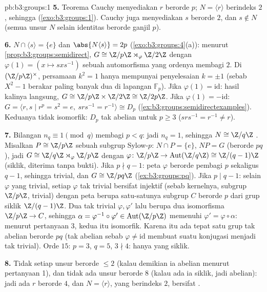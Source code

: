\begin{solution}{pb:b3:groups:1}
\textbf{5.} Teorema Cauchy menyediakan $r$ berorde $p$; $N = \langle r
\rangle$ berindeks $2$, sehingga  (\cref{exo:b3:groups:1}).
Cauchy juga menyediakan $s$ berorde $2$, dan $s \notin N$ (semua
unsur $N$ selain identitas berorde ganjil $p$).

\textbf{6.} $N \cap \langle s \rangle = \{e\}$ dan $\abs{N\langle
s\rangle} = 2p$ (\cref{exo:b3:groups:4}(a)): menurut
\cref{prop:b3:groups:semidirect}, $G \cong \Z/p\Z \rtimes_\varphi
\Z/2\Z$ dengan $\varphi(1) = (x \mapsto sxs^{-1})$ sebuah automorfisma
yang ordenya membagi $2$. Di $(\Z/p\Z)^\times$, persamaan $k^2 = 1$ hanya mempunyai
penyelesaian $k = \pm 1$ (sebab $X^2 - 1$ berakar paling banyak dua di
lapangan $\mathbb F_p$). Jika $\varphi(1) = \mathrm{id}$: hasil kalinya
langsung, $G \cong \Z/p\Z \times \Z/2\Z \cong \Z/2p\Z$. Jika
$\varphi(1) = -\mathrm{id}$: $G = \langle r, s \mid r^p = s^2 = e,
\ srs^{-1} = r^{-1}\rangle \cong D_p$
(\cref{ex:b3:groups:semidirectexamples}). Keduanya tidak isomorfik:
$D_p$ tak abelian untuk $p \geq 3$ ($srs^{-1} = r^{-1} \neq r$).

\textbf{7.} Bilangan $n_q \equiv 1 \pmod q$ membagi $p < q$: jadi $n_q = 1$, sehingga
$N \cong \Z/q\Z$ . Misalkan $P \cong \Z/p\Z$ sebuah subgrup
Sylow-$p$: $N \cap P = \{e\}$, $NP = G$ (berorde $pq$), jadi $G
\cong \Z/q\Z \rtimes_\varphi \Z/p\Z$ dengan $\varphi \colon \Z/p\Z
\to \operatorname{Aut}(\Z/q\Z) \cong \Z/(q-1)\Z$ (siklik,
diterima tanpa bukti). Jika $p \nmid q - 1$: peta $\varphi$ berorde
pembagi $p$ sekaligus $q-1$, sehingga trivial, dan $G \cong
\Z/pq\Z$ (\cref{ex:b3:groups:pq}). Jika $p \mid q - 1$: selain
$\varphi$ yang trivial, setiap $\varphi$ tak trivial bersifat injektif (sebab
kernelnya, subgrup $\Z/p\Z$, trivial) dengan peta berupa
satu-satunya subgrup $C$ berorde $p$ dari grup siklik
$\Z/(q-1)\Z$. Dua  tak trivial $\varphi, \varphi'$ lalu berupa
dua isomorfisma $\Z/p\Z \to C$, sehingga $\alpha =
\varphi^{-1}\circ\varphi' \in \operatorname{Aut}(\Z/p\Z)$
memenuhi $\varphi' = \varphi\circ\alpha$: menurut pertanyaan 3, kedua
 itu isomorfik. Karena itu ada tepat satu grup tak abelian
berorde $pq$ (tak abelian sebab $\varphi \neq
\mathrm{id}$ membuat suatu konjugasi menjadi tak trivial). Orde $15$: $p =
3$, $q = 5$, $3 \nmid 4$: hanya yang siklik.

\textbf{8.} Tidak setiap unsur berorde $\leq 2$ (kalau demikian ia abelian menurut
pertanyaan 1), dan tidak ada unsur berorde $8$ (kalau ada ia siklik, jadi abelian):
jadi ada $r$ berorde $4$, dan $N = \langle r\rangle$, yang berindeks $2$,
bersifat .


\end{solution}
